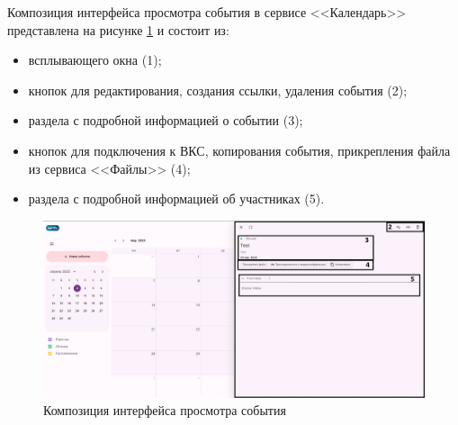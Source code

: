 Композиция интерфейса просмотра события в сервисе <<Календарь>> представлена на рисунке \ref{templ:image3c} и состоит из:
\begin{itemize}
  \item всплывающего окна (1);
  \item кнопок для редактирования, создания ссылки, удаления события (2);
  \item раздела с подробной информацией о событии (3);
  \item кнопок для подключения к ВКС, копирования события, прикрепления файла из сервиса <<Файлы>> (4);
  \item раздела с подробной информацией об участниках (5).
\end{itemize}
\begin{figure}[H]
	\centering
	\includegraphics[width=1\linewidth]{images/календарь3}
	\caption{Композиция интерфейса просмотра события}
	\label{templ:image3c}
\end{figure}

